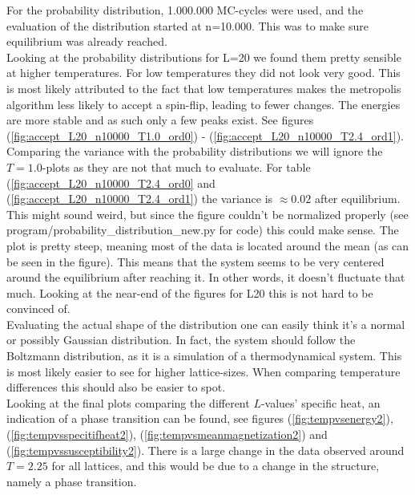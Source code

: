 \documentclass{article}
\begin{document}
For the probability distribution, 1.000.000 MC-cycles were used, and the evaluation of the distribution started at n=10.000. This was to make sure equilibrium was already reached.\\

Looking at the probability distributions for L=20 we found them pretty sensible at higher temperatures. For low temperatures they did not look very good. This is most likely attributed to the fact that low temperatures makes the metropolis algorithm less likely to accept a spin-flip, leading to fewer changes. The energies are more stable and as such only a few peaks exist. See figures (\ref{fig:accept_L20_n10000_T1.0_ord0}) - (\ref{fig:accept_L20_n10000_T2.4_ord1}). \\

Comparing the variance with the probability distributions we will ignore the $T=1.0$-plots as they are not that much to evaluate. For table (\ref{fig:accept_L20_n10000_T2.4_ord0} and (\ref{fig:accept_L20_n10000_T2.4_ord1}) the variance is $\approx0.02$ after equilibrium. This might sound weird, but since the figure couldn't be normalized properly (see program/probability\_distribution\_new.py for code) this could make sense. The plot is pretty steep, meaning most of the data is located around the mean (as can be seen in the figure). This means that the system seems to be very centered around the equilibrium after reaching it. In other words, it doesn't fluctuate that much. Looking at the near-end of the figures for L20 this is not hard to be convinced of.\\

Evaluating the actual shape of the distribution one can easily think it's a normal or possibly Gaussian distribution. In fact, the system should follow the Boltzmann distribution, as it is a simulation of a thermodynamical system. This is most likely easier to see for higher lattice-sizes. When comparing temperature differences this should also be easier to spot. \\


Looking at the final plots comparing the different $L$-values' specific heat, an indication of a phase transition can be found, see figures (\ref{fig:tempvsenergy2}), (\ref{fig:tempvsspecitifheat2}), (\ref{fig:tempvsmeanmagnetization2}) and (\ref{fig:tempvssusceptibility2}).
There is a large change in the data observed around $T=2.25$ for all lattices, and this would be due to a change in the structure, namely a phase transition. \\
\end{document}
